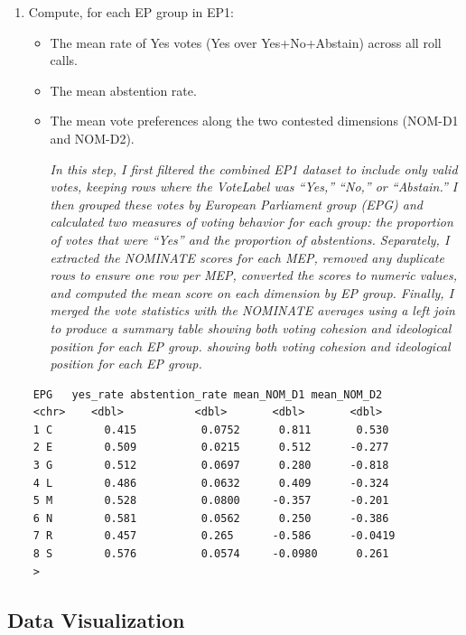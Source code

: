 \documentclass[12pt,letterpaper]{article}
\begin{document}
\begin{enumerate}
\item Compute, for each EP group in EP1:
\begin{itemize}
	\item The mean rate of Yes votes (Yes over Yes+No+Abstain) across all roll calls.
		\item The mean abstention rate.
	\item The mean vote preferences along the two contested dimensions (NOM-D1 and NOM-D2).
		
				\textit {In this step, I first filtered the combined EP1 dataset to include only valid votes, keeping rows where the VoteLabel was “Yes,” “No,” or “Abstain.” I then grouped these votes by European Parliament group (EPG) and calculated two measures of voting behavior for each group: the proportion of votes that were “Yes”  and the proportion of abstentions. Separately, I extracted the NOMINATE scores  for each MEP, removed any duplicate rows to ensure one row per MEP, converted the scores to numeric values, and computed the mean score on each dimension by EP group. Finally, I merged the vote statistics with the NOMINATE averages using a left join to produce a summary table  showing both voting cohesion and ideological position for each EP group. showing both voting cohesion and ideological position for each EP group.}

\end{itemize}{}
\end{enumerate}

\begin{verbatim}
	EPG   yes_rate abstention_rate mean_NOM_D1 mean_NOM_D2
	<chr>    <dbl>           <dbl>       <dbl>       <dbl>
	1 C        0.415          0.0752      0.811       0.530 
	2 E        0.509          0.0215      0.512      -0.277 
	3 G        0.512          0.0697      0.280      -0.818 
	4 L        0.486          0.0632      0.409      -0.324 
	5 M        0.528          0.0800     -0.357      -0.201 
	6 N        0.581          0.0562      0.250      -0.386 
	7 R        0.457          0.265      -0.586      -0.0419
	8 S        0.576          0.0574     -0.0980      0.261 
	> 		
\end{verbatim}
\subsection*{Data Visualization}
\end{document}
